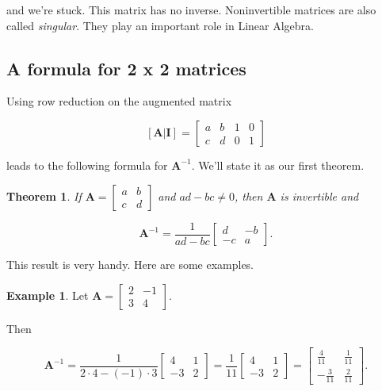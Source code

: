 \documentclass[
]{book}
\newtheorem{theorem}{Theorem}[chapter]
\theoremstyle{definition}
\theoremstyle{definition}
\newtheorem{example}{Example}[chapter]
\theoremstyle{definition}
\theoremstyle{definition}
\theoremstyle{remark}
\begin{document}
and we're stuck. This matrix has no inverse. Noninvertible matrices are also called \emph{singular}. They play an important role in Linear Algebra.

\subsection*{A formula for 2 x 2 matrices}\label{a-formula-for-2-x-2-matrices}

Using row reduction on the augmented matrix

\[\left[\mathbf{A}|\mathbf{I}\right]=\left[\begin{array}{rr|rr}
a & b & 1 & 0\\ c & d & 0 & 1
\end{array}\right] \]

leads to the following formula for \(\mathbf{A}^{-1}\). We'll state it as our first theorem.

\begin{theorembox}

\begin{theorem}
\protect\hypertarget{thm:2b2invthm}{}\label{thm:2b2invthm}If \(\mathbf{A}=\displaystyle{\begin{bmatrix}a & b\\c & d\end{bmatrix}}\) and \(ad-bc\neq 0\), then \(\mathbf{A}\) is invertible and

\[\mathbf{A}^{-1}=\frac{1}{ad-bc}\begin{bmatrix}
d & -b\\-c & a
\end{bmatrix}.\label{eq:2b2inv}\]
\end{theorem}

\end{theorembox}

This result is very handy. Here are some examples.

\begin{examplebox}

\begin{example}
Let \(\mathbf{A}=\displaystyle{\begin{bmatrix}
2 & -1 \\ 3 & 4
\end{bmatrix}}.\)

Then

\[\mathbf{A}^{-1}=\frac{1}{2\cdot 4-(-1)\cdot 3}\begin{bmatrix}
4 & 1\\-3 & 2
\end{bmatrix}=\frac{1}{11}\begin{bmatrix}
4 & 1\\-3 & 2
\end{bmatrix}=\begin{bmatrix}
\frac{4}{11} & \frac{1}{11}\\ -\frac{3}{11} & \frac{2}{11}
\end{bmatrix}.\]
\end{example}

\end{examplebox}
\end{document}
